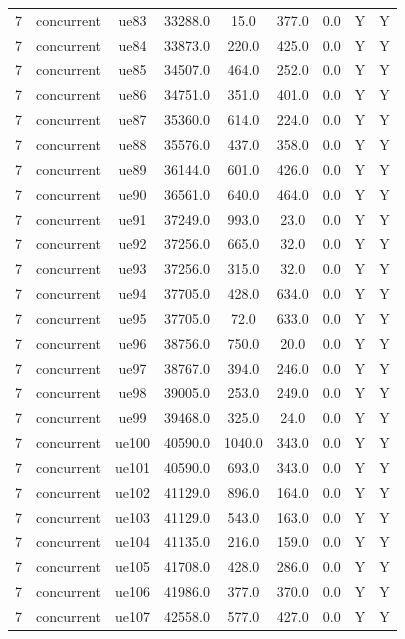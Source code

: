 \begin{table}[ht]
\begin{tabular}{|c|c|c|c|c|c|c|c|c|}
7 & concurrent & ue83 & 33288.0 & 15.0 & 377.0 & 0.0 & Y & Y \\
7 & concurrent & ue84 & 33873.0 & 220.0 & 425.0 & 0.0 & Y & Y \\
7 & concurrent & ue85 & 34507.0 & 464.0 & 252.0 & 0.0 & Y & Y \\
7 & concurrent & ue86 & 34751.0 & 351.0 & 401.0 & 0.0 & Y & Y \\
7 & concurrent & ue87 & 35360.0 & 614.0 & 224.0 & 0.0 & Y & Y \\
7 & concurrent & ue88 & 35576.0 & 437.0 & 358.0 & 0.0 & Y & Y \\
7 & concurrent & ue89 & 36144.0 & 601.0 & 426.0 & 0.0 & Y & Y \\
7 & concurrent & ue90 & 36561.0 & 640.0 & 464.0 & 0.0 & Y & Y \\
7 & concurrent & ue91 & 37249.0 & 993.0 & 23.0 & 0.0 & Y & Y \\
7 & concurrent & ue92 & 37256.0 & 665.0 & 32.0 & 0.0 & Y & Y \\
7 & concurrent & ue93 & 37256.0 & 315.0 & 32.0 & 0.0 & Y & Y \\
7 & concurrent & ue94 & 37705.0 & 428.0 & 634.0 & 0.0 & Y & Y \\
7 & concurrent & ue95 & 37705.0 & 72.0 & 633.0 & 0.0 & Y & Y \\
7 & concurrent & ue96 & 38756.0 & 750.0 & 20.0 & 0.0 & Y & Y \\
7 & concurrent & ue97 & 38767.0 & 394.0 & 246.0 & 0.0 & Y & Y \\
7 & concurrent & ue98 & 39005.0 & 253.0 & 249.0 & 0.0 & Y & Y \\
7 & concurrent & ue99 & 39468.0 & 325.0 & 24.0 & 0.0 & Y & Y \\
7 & concurrent & ue100 & 40590.0 & 1040.0 & 343.0 & 0.0 & Y & Y \\
7 & concurrent & ue101 & 40590.0 & 693.0 & 343.0 & 0.0 & Y & Y \\
7 & concurrent & ue102 & 41129.0 & 896.0 & 164.0 & 0.0 & Y & Y \\
7 & concurrent & ue103 & 41129.0 & 543.0 & 163.0 & 0.0 & Y & Y \\
7 & concurrent & ue104 & 41135.0 & 216.0 & 159.0 & 0.0 & Y & Y \\
7 & concurrent & ue105 & 41708.0 & 428.0 & 286.0 & 0.0 & Y & Y \\
7 & concurrent & ue106 & 41986.0 & 377.0 & 370.0 & 0.0 & Y & Y \\
7 & concurrent & ue107 & 42558.0 & 577.0 & 427.0 & 0.0 & Y & Y \\

\end{tabular}
\end{table}
